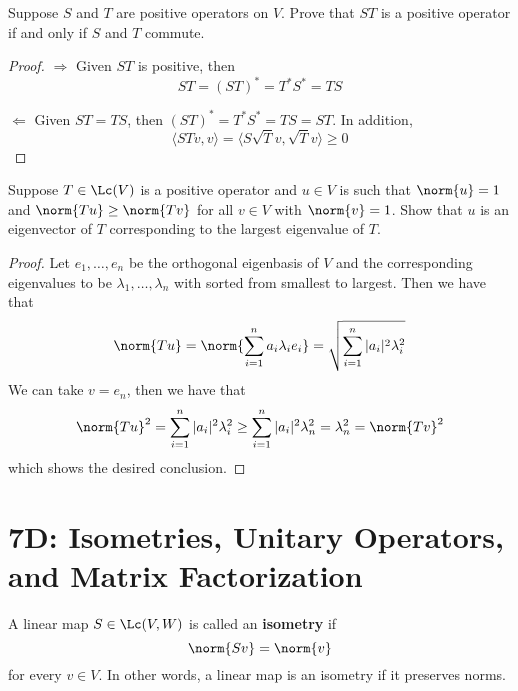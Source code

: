 \documentclass{extarticle}
\begin{document}
\begin{problem}{18}
    Suppose \(S\) and \(T\) are positive operators on \(V\). Prove that \(ST\) is a positive
    operator if and only if \(S\) and \(T\) commute.
\end{problem}

\begin{proof}
\(\Rightarrow\) Given \(ST\) is positive, then
\[ST = (ST)^* = T^* S^* = TS \]

\(\Leftarrow\) Given \(ST = TS\), then \((ST)^* = T^* S^* = TS = ST\). In addition,
\[\langle ST v,v \rangle = \langle S\sqrt{T}v,\sqrt{T}v \rangle \geq 0\]
\end{proof}

\begin{problem}{22}
    Suppose \(T \in \Lc(V)\) is a positive operator and \(u \in V\) is such that
    \(\norm{u} =1\) and \(\norm{Tu} \geq \norm{Tv}\) for all \(v \in V\) with \(\norm{v} = 1\).
    Show that \(u\) is an eigenvector of \(T\) corresponding to the largest eigenvalue of \(T\).
\end{problem}

\begin{proof}
Let \(e_1, \ldots, e_n\) be the orthogonal eigenbasis of \(V\) and the corresponding eigenvalues
to be \(\lambda_1, \ldots, \lambda_n\) with sorted from smallest to largest. Then we have that
\[\norm{Tu} = \norm{\sum_{i=1}^{n} a_i \lambda_i e_i} = \sqrt{\sum_{i=1}^{n} |a_i|^2 \lambda_i^2}\]
We can take \(v = e_n\), then we have that
\[\norm{Tu}^2 = \sum_{i=1}^{n} |a_i|^2 \lambda_i^2 \geq \sum_{i=1}^{n} |a_i|^2 \lambda_n^2
= \lambda_n^2 = \norm{Tv}^2\]
which shows the desired conclusion.
\end{proof}


\newpage
\section*{7D: Isometries, Unitary Operators, and Matrix Factorization}

\begin{definition}[isometry]
    A linear map \(S \in \Lc(V, W)\) is called an \textbf{isometry} if
    \[\norm{Sv} = \norm{v}\]
    for every \(v \in V\). In other words, a linear map is an isometry if it preserves norms.
\end{definition}
\end{document}
